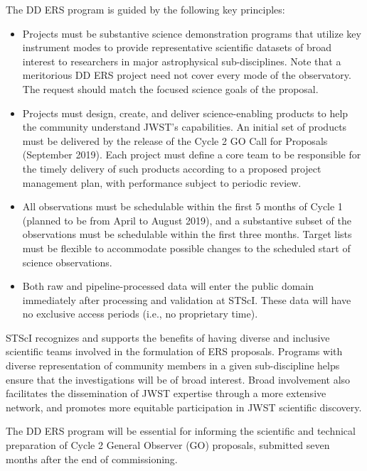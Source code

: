 \noindent
The DD ERS program is guided by the following key principles:
\begin{itemize}
\item Projects must be substantive science demonstration programs that utilize key instrument modes to provide representative scientific datasets of broad interest to researchers in major astrophysical sub-disciplines. Note that a meritorious DD ERS project need not cover every mode of the observatory. The request should match the focused science goals of the proposal.

\item Projects must design, create, and deliver science-enabling products to help the community understand JWST's capabilities.  An initial set of products must be delivered by the release of the Cycle 2 GO Call for Proposals (September 2019).  Each project must define a core team to be responsible for the timely delivery of such products according to a proposed project management plan, with performance subject to periodic review.

\item All observations must be schedulable within the first 5 months of Cycle 1 (planned to be from April to August 2019), and a substantive subset of the observations must be schedulable within the first three months.   Target lists must be flexible to accommodate possible changes to the scheduled start of science observations.

\item Both raw and pipeline-processed data will enter the public domain immediately after processing and validation at STScI. These data will have no exclusive access periods (i.e., no proprietary time).
\end{itemize}


\smallskip \smallskip
\noindent
STScI recognizes and supports the benefits of having diverse and inclusive scientific teams involved in the formulation of ERS proposals.  Programs with diverse representation of community members in a given sub-discipline helps ensure that the investigations will be of broad interest. Broad involvement also facilitates the dissemination of JWST expertise through a more extensive network, and promotes more equitable participation in JWST scientific discovery.

\smallskip \smallskip
\noindent
The DD ERS program will be essential for informing the scientific and technical preparation of Cycle 2 General Observer (GO) proposals, submitted seven months after the end of commissioning.



